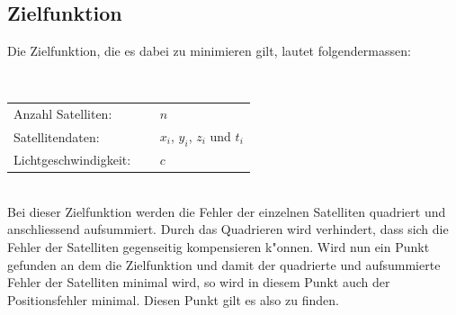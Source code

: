 	\subsection{Zielfunktion}
		Die Zielfunktion, die es dabei zu minimieren gilt, lautet folgendermassen:\\[0.2cm]
		\begin{minipage}{1\textwidth}
		\end{minipage}\\[0.2cm]
		\begin{minipage}{1\textwidth}
			\begin{tabular}{ll}
				Anzahl Satelliten: $\quad$& $n$\\
				Satellitendaten: $\quad$& $x_i$, $y_i$, $z_i$ und $t_i$\\
				Lichtgeschwindigkeit: $\quad$& $c$\\
			\end{tabular}
		\end{minipage}\\[0.3cm]
		Bei dieser Zielfunktion werden die Fehler der einzelnen Satelliten quadriert und anschliessend aufsummiert. Durch das Quadrieren wird verhindert, dass sich die Fehler der Satelliten gegenseitig kompensieren k"onnen. Wird nun ein Punkt gefunden an dem die Zielfunktion und damit der quadrierte und aufsummierte Fehler der Satelliten minimal wird, so wird in diesem Punkt auch der Positionsfehler minimal. Diesen Punkt gilt es also zu finden.

